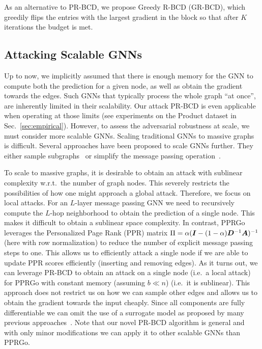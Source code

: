 \documentclass[sigconf, review]{acmart}
\begin{document}
As an alternative to PR-BCD, we propose Greedy R-BCD (GR-BCD), which greedily flips the entries with the largest gradient in the block so that after \(K\) iterations the budget is met.

\subsection{Attacking Scalable GNNs}\label{sec:localattack}
Up to now, we implicitly assumed that there is enough memory for the GNN to compute both the prediction for a given node, as well as obtain the gradient towards the edges.
Such GNNs that typically process the whole graph ``at once'', are inherently limited in their scalability. Our attack PR-BCD is even applicable when operating at those limits (see experiments on the Product dataset in Sec.~\ref{sec:empirical}). However, to assess the adversarial robustness at scale, we must consider more scalable GNNs. Scaling traditional GNNs to massive graphs is difficult. Several approaches have been proposed to scale GNNs further. They either sample subgraphs~\citep{Chen2018a, Chiang2019} or simplify the message passing operation~\citep{Bojchevski2020a}.

To scale to massive graphs, it is desirable to obtain an attack with sublinear complexity w.r.t.\ the number of graph nodes. This severely restricts the possibilities of how one might approach a global attack. Therefore, we focus on local attacks.
For an \(L\)-layer message passing GNN we need to recursively compute the \(L\)-hop neighborhood to obtain the prediction of a single node.
This makes it difficult to obtain a sublinear space complexity. In contrast, PPRGo~\citep{Bojchevski2020a} leverages the Personalized Page Rank (PPR) matrix \(\Pi = \alpha({\bm{I}} - (1-\alpha){\bm{D}}^{-1}{\bm{A}})^{-1}\) (here with row normalization) to reduce the number of explicit message passing steps to one. This allows us to efficiently attack a single node if we are able to update PPR scores efficiently (inserting and removing edges). As it turns out, we can leverage PR-BCD to obtain an attack on a single node (i.e.\ a local attack) for PPRGo with constant memory (assuming \(b \ll n\)) (i.e.\ it is sublinear). This approach does not restrict us on how we can sample other edges and allows us to obtain the gradient towards the input cheaply. Since all components are fully differentiable we can omit the use of a surrogate model as proposed by many previous approaches~\cite{Zugner2018, Wang2020}. Note that our novel PR-BCD algorithm is general and with only minor modifications we can apply it to other scalable GNNs than PPRGo.
\end{document}

